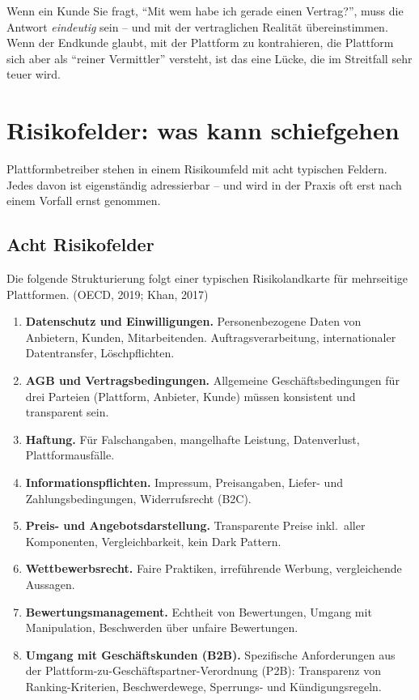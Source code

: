\documentclass[11pt,a4paper,oneside]{article}
\newcommand{\fachbegriff}[1]{\textbf{#1}}
\newcommand{\quelle}[1]{{\footnotesize\color{lpGray}(#1)}}
\begin{document}
\begin{merkbox}
Wenn ein Kunde Sie fragt, ``Mit wem habe ich gerade einen Vertrag?'', muss die Antwort \emph{eindeutig} sein -- und mit der vertraglichen Realität übereinstimmen. Wenn der Endkunde glaubt, mit der Plattform zu kontrahieren, die Plattform sich aber als ``reiner Vermittler'' versteht, ist das eine Lücke, die im Streitfall sehr teuer wird.
\end{merkbox}

\section{Risikofelder: was kann schiefgehen}

Plattformbetreiber stehen in einem Risikoumfeld mit acht typischen Feldern. Jedes davon ist eigenständig adressierbar -- und wird in der Praxis oft erst nach einem Vorfall ernst genommen.

\subsection{Acht Risikofelder}

Die folgende Strukturierung folgt einer typischen Risikolandkarte für mehrseitige Plattformen. \quelle{OECD, 2019; Khan, 2017}

\begin{enumerate}
  \item \fachbegriff{Datenschutz und Einwilligungen.} Personenbezogene Daten von Anbietern, Kunden, Mitarbeitenden. Auftragsverarbeitung, internationaler Datentransfer, Löschpflichten.
  \item \fachbegriff{AGB und Vertragsbedingungen.} Allgemeine Geschäftsbedingungen für drei Parteien (Plattform, Anbieter, Kunde) müssen konsistent und transparent sein.
  \item \fachbegriff{Haftung.} Für Falschangaben, mangelhafte Leistung, Datenverlust, Plattformausfälle.
  \item \fachbegriff{Informationspflichten.} Impressum, Preisangaben, Liefer- und Zahlungsbedingungen, Widerrufsrecht (B2C).
  \item \fachbegriff{Preis- und Angebotsdarstellung.} Transparente Preise inkl.\ aller Komponenten, Vergleichbarkeit, kein Dark Pattern.
  \item \fachbegriff{Wettbewerbsrecht.} Faire Praktiken, irreführende Werbung, vergleichende Aussagen.
  \item \fachbegriff{Bewertungsmanagement.} Echtheit von Bewertungen, Umgang mit Manipulation, Beschwerden über unfaire Bewertungen.
  \item \fachbegriff{Umgang mit Geschäftskunden (B2B).} Spezifische Anforderungen aus der Plattform-zu-Geschäftspartner-Verordnung (P2B): Transparenz von Ranking-Kriterien, Beschwerdewege, Sperrungs- und Kündigungsregeln.
\end{enumerate}
\end{document}
